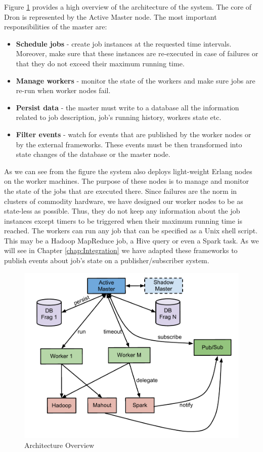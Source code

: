 \documentclass[11pt,a4paper,twoside]{report}
\begin{document}
Figure \ref{fig:DronDesign1} provides a high overview of the architecture of the
system. The core of Dron is represented by the Active Master node. The most important responsibilities of the master are:


\begin{itemize}
\item{}
\textbf{Schedule jobs} - create job instances at the requested time intervals. Moreover, make sure that these instances are re-executed in case of failures or that they do not exceed their maximum running time.
\item{}
\textbf{Manage workers} - monitor the state of the workers and make sure jobs are re-run when worker nodes fail.
\item{}
\textbf{Persist data} - the master must write to a database all the information related to job description, job's running history, workers state etc.
\item{}
\textbf{Filter events} - watch for events that are published by the worker nodes or by the external frameworks. These events must be then transformed into state changes of the database or the master node.
\end{itemize}


As we can see from the figure the system also deploys light-weight Erlang nodes on the worker machines. The purpose of these nodes is to manage and monitor the state of the jobs that are executed there. Since failures are the norm in clusters of commodity hardware, we have designed our worker nodes to be as state-less as possible. Thus, they do not keep any information about the job instances except timers to be triggered when their maximum running time is reached. The workers can run any job that can be specified as a Unix shell script. This may be a Hadoop MapReduce job, a Hive query or even a Spark task. As we will see in Chapter \ref{chap:Integration} we have adapted these frameworks to publish events about job's state on a publisher/subscriber system.


\begin{figure}[h]
\centering
\includegraphics[scale=0.87]{DronDesign1}
\caption{Architecture Overview}
\label{fig:DronDesign1}
\end{figure}
\end{document}
